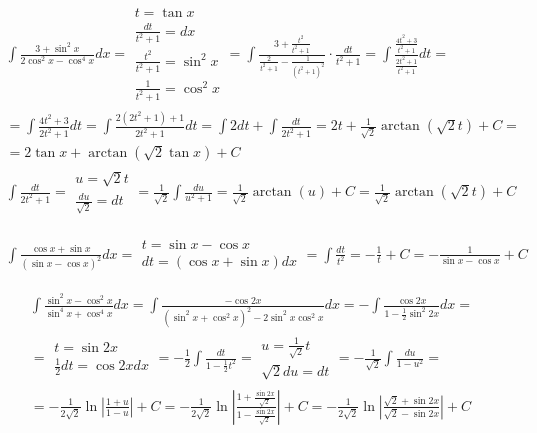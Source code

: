 
\begin{gather*}\int \frac{3+\sin^2 x}{2\cos^2 x - \cos^4 x}dx = \begin{array}{|l|}
t=\tan x \\
\frac{dt}{t^2+1}=dx \\
\frac{t^2}{t^2+1}=\sin^2 x \\
\frac{1}{t^2+1}=\cos^2 x
\end{array} = \int \frac{3+\frac{t^2}{t^2+1}}{\frac{2}{t^2+1}-\frac{1}{(t^2+1)^2}}\cdot\frac{dt}{t^2+1} = \int \frac{\frac{4t^2+3}{t^2+1}}{\frac{2t^2+1}{t^2+1}}dt = \\  = \int \frac{4t^2+3}{2t^2+1}dt = \int \frac{2(2t^2+1)+1}{2t^2+1}dt = \int 2dt+\int \frac{dt}{2t^2+1}=2t+\frac{1}{\sqrt{2}}\arctan (\sqrt{2}t)+C =\\ = 2\tan x+\arctan (\sqrt{2}\tan x)+C \\
\int \frac{dt}{2t^2+1} = \begin{array}{|l|} u=\sqrt{2}t \\ \frac{du}{\sqrt{2}}=dt \end{array} = \frac{1}{\sqrt{2}}\int \frac{du}{u^2+1} = \frac{1}{\sqrt{2}}\arctan(u)+C=\frac{1}{\sqrt{2}}\arctan (\sqrt{2}t)+C \end{gather*}



\begin{gather*}\int \frac{\cos x + \sin x}{(\sin x - \cos x)^2}dx = \begin{array}{|l|} t=\sin x - \cos x \\ dt=(\cos x + \sin x)dx \end{array} = \int \frac{dt}{t^2}=-\frac{1}{t}+C = -\frac{1}{\sin x - \cos x}+C \end{gather*}



\begin{gather*}\int \frac{\sin^2 x - \cos^2 x}{\sin^4 x + \cos^4 x}dx = \int \frac{-\cos 2x}{(\sin^2x+\cos^2x)^2-2\sin^2x\cos^2x}dx = -\int \frac{\cos 2x}{1-\frac{1}{2}\sin^{2} 2x}dx =  \\
= \begin{array}{|l|} t=\sin 2x \\ \frac{1}{2}dt=\cos 2x dx \end{array} = -\frac{1}{2}\int \frac{dt}{1-\frac{1}{2}t^2} = \begin{array}{|l|} u=\frac{1}{\sqrt{2}}t \\ \sqrt{2}du=dt \end{array} = -\frac{1}{\sqrt{2}}\int \frac{du}{1-u^2} =  \\
= -\frac{1}{2\sqrt{2}}\ln\left|\frac{1+u}{1-u}\right|+C = -\frac{1}{2\sqrt{2}}\ln\left|\frac{1+\frac{\sin 2x}{\sqrt{2}}}{1-\frac{\sin 2x}{\sqrt{2}}}\right|+C = -\frac{1}{2\sqrt{2}}\ln\left|\frac{\sqrt{2}+\sin 2x}{\sqrt{2}-\sin 2x}\right|+C\end{gather*}


